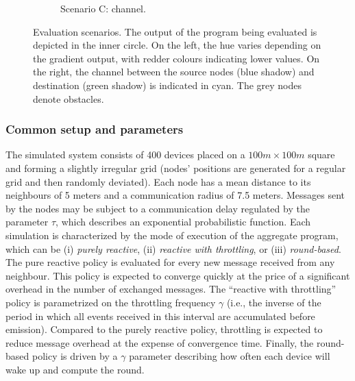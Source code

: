 \begin{figure}
\begin{subfigure}[b]{0.49\linewidth}
        \caption{Scenario C: channel.}
        \label{acsos2023-frp:fig:scenario-c}
    \end{subfigure}
    \caption[Evaluation scenarios implemented with \ac{langname}]{
      Evaluation scenarios.
      The output of the program being evaluated is depicted in the inner circle. 
      On the left, the hue varies depending on the gradient output, with redder colours indicating lower values. 
      On the right, the channel between the source nodes (blue shadow) and destination (green shadow) is indicated in cyan.
      The grey nodes denote obstacles. %
    }
    \label{acsos2023-frp:fig:scenario-screenshots}
\end{figure}

\subsubsection{Common setup and parameters}
%
The simulated system consists of 400 devices 
 placed on a $100 m \times 100 m $ square and forming a slightly irregular grid
(nodes' positions are generated for a regular grid and then randomly deviated).
%
Each node has a mean distance to its neighbours of 5 meters
 and a communication radius of 7.5 meters. 
%
Messages sent by the nodes may be subject to a communication delay
 regulated by the parameter $\tau$, which describes an exponential probabilistic function.
%
Each simulation is characterized by the mode of execution of the aggregate program,
 which can be 
 (i) \emph{purely reactive}, 
 (ii) \emph{reactive with throttling}, or 
 (iii) \emph{round-based}. 
%
The pure reactive policy is evaluated for every new message received from any neighbour.
%
This policy is expected to converge quickly
at the price of a significant overhead in the number of exchanged messages.
% 
The ``reactive with throttling'' policy
 is %
 parametrized on the throttling frequency $\gamma$
(i.e.,  the inverse of the period in which all events received in this interval are accumulated before emission).
%
Compared to the purely reactive policy,
  throttling is expected to reduce message overhead at the expense of convergence time. 
%
Finally, the round-based policy is driven by a $\gamma$ parameter
 describing how often each device will wake up and compute the round.

